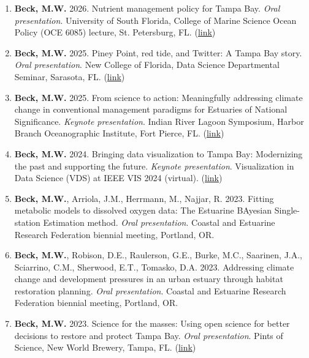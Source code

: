 \documentclass[letterpaper,12pt]{article}
\begin{document}
\begin{enumerate}
\item {\bf Beck, M.W.} 2026. Nutrient management policy for Tampa Bay. \textit{Oral presentation}. University of South Florida, College of Marine Science Ocean Policy (OCE 6085) lecture, St. Petersburg, FL. ({\footnotesize\href{https://docs.google.com/presentation/d/1my11_INS59pDJ2zVRrgaaTgzGfihLYgj/edit?usp=sharing&ouid=111030724967489561225&rtpof=true&sd=true}{link}})

\item {\bf Beck, M.W.} 2025. Piney Point, red tide, and Twitter: A Tampa Bay story. \textit{Oral presentation}. New College of Florida, Data Science Departmental Seminar, Sarasota, FL. ({\footnotesize\href{https://docs.google.com/presentation/d/1X0T6_zcCld4mYPsuJ5rOKRXGfRLH8B5tuXgMLmtvZ-E/edit?usp=sharing}{link}})

\item {\bf Beck, M.W.} 2025. From science to action: Meaningfully addressing climate change in conventional management paradigms for Estuaries of National Significance. \textit{Keynote presentation}. Indian River Lagoon Symposium, Harbor Branch Oceanographic Institute, Fort Pierce, FL. ({\footnotesize\href{https://docs.google.com/presentation/d/1NyJmPY7wL00SsGyN4EMLyvWimSKsG8ZfODNXctcTSR4/edit?usp=sharing}{link}})

\item {\bf Beck, M.W.} 2024. Bringing data visualization to Tampa Bay: Modernizing the past and supporting the future. \textit{Keynote presentation}. Visualization in Data Science (VDS) at IEEE VIS 2024 (virtual). ({\footnotesize\href{https://docs.google.com/presentation/d/16ClCOSOBhaj811QitUi6y6snsuER34rOU0ByS2i-xT4/edit?usp=sharing}{link}})

\item {\bf Beck, M.W.}, Arriola, J.M., Herrmann, M., Najjar, R. 2023. Fitting metabolic models to dissolved oxygen data: The Estuarine BAyesian Single-station Estimation method. \textit{Oral presentation}. Coastal and Estuarine Research Federation biennial meeting, Portland, OR. 

\item {\bf Beck, M.W.}, Robison, D.E., Raulerson, G.E., Burke, M.C., Saarinen, J.A., Sciarrino, C.M., Sherwood, E.T., Tomasko, D.A. 2023. Addressing climate change and development pressures in an urban estuary through habitat restoration planning. \textit{Oral presentation}. Coastal and Estuarine Research Federation biennial meeting, Portland, OR. 

\item {\bf Beck, M.W.} 2023. Science for the masses: Using open science for better decisions to restore and protect Tampa Bay. \textit{Oral presentation}. Pints of Science, New World Brewery, Tampa, FL. ({\footnotesize\href{https://docs.google.com/presentation/d/1cphkJnifIwnk3-j4yLB2qkYiJl0wLnk5hqOFqnm0aDU/edit?usp=sharing}{link}})


\end{enumerate}
\end{document}

